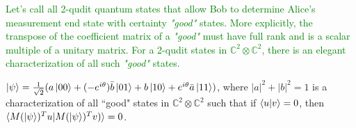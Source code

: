 \textcolor{green}{Let's call all 2-qudit quantum states that allow Bob to determine Alice's measurement end state with certainty \emph{"good"} states. More explicitly, the transpose of the coefficient matrix of a \emph{"good"} must have full rank and is a scalar multiple of a unitary matrix. For a 2-qudit states in $\mathbb{C}^2 \otimes \mathbb{C}^2$, there is an elegant characterization of all such \emph{"good"} states.} 
\begin{corollary}
$\ket{\psi}=\frac{1}{\sqrt{2}}(a\ket{00}+(-e^{i\theta})\Bar{b}\ket{01}+b\ket{10}+e^{i\theta}\Bar{a}\ket{11})$, where $|a|^2+|b|^2=1$ is a characterization of all “good" states in $\mathbb{C}^2 \otimes \mathbb{C}^2$ such that if $\braket{u|v}=0$, then $\braket{M(\ket{\psi})^Tu|M(\ket{\psi})^Tv)}=0$.
\end{corollary}

